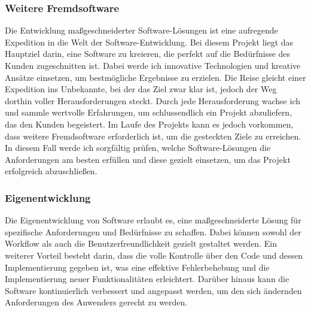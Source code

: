 \begin{flushleft}
\subsubsection{Weitere Fremdsoftware}
Die Entwicklung maßgeschneiderter Software-Lösungen ist eine aufregende Expedition in die Welt der Software-Entwicklung. Bei diesem Projekt liegt das Hauptziel darin, eine Software zu kreieren, die perfekt auf die Bedürfnisse des Kunden zugeschnitten ist. Dabei werde ich innovative Technologien und kreative Ansätze einsetzen, um bestmögliche Ergebnisse zu erzielen.
Die Reise gleicht einer Expedition ins Unbekannte, bei der das Ziel zwar klar ist, jedoch der Weg dorthin voller Herausforderungen steckt. Durch jede Herausforderung wachse ich und sammle wertvolle Erfahrungen, um schlussendlich ein Projekt abzuliefern, das den Kunden begeistert.
Im Laufe des Projekts kann es jedoch vorkommen, dass weitere Fremdsoftware erforderlich ist, um die gesteckten Ziele zu erreichen. In diesem Fall werde ich sorgfältig prüfen, welche Software-Lösungen die Anforderungen am besten erfüllen und diese gezielt einsetzen, um das Projekt erfolgreich abzuschließen.

\subsubsection{Eigenentwicklung}
Die Eigenentwicklung von Software erlaubt es, eine maßgeschneiderte Lösung für spezifische Anforderungen und Bedürfnisse zu schaffen.
Dabei können sowohl der Workflow als auch die Benutzerfreundlichkeit gezielt gestaltet werden.
Ein weiterer Vorteil besteht darin, dass die volle Kontrolle über den Code und dessen Implementierung gegeben ist,
was eine effektive Fehlerbehebung und die Implementierung neuer Funktionalitäten erleichtert.
Darüber hinaus kann die Software kontinuierlich verbessert und angepasst werden,
um den sich ändernden Anforderungen des Anwenders gerecht zu werden.


\end{flushleft}
